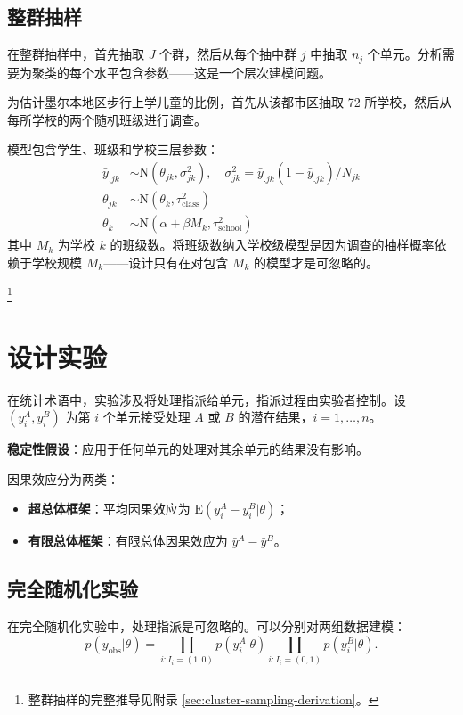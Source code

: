 \subsection{整群抽样}

在整群抽样中，首先抽取 $J$ 个群，然后从每个抽中群 $j$ 中抽取 $n_j$ 个单元。分析需要为聚类的每个水平包含参数——这是一个层次建模问题。

\begin{Example}[澳大利亚学童调查]
  为估计墨尔本地区步行上学儿童的比例，首先从该都市区抽取 72 所学校，然后从每所学校的两个随机班级进行调查。

  模型包含学生、班级和学校三层参数：
  \begin{align}
    \bar{y}_{.jk} &\sim \mathrm{N}(\theta_{jk}, \sigma_{jk}^2), \quad \sigma_{jk}^2 = \bar{y}_{.jk}(1-\bar{y}_{.jk})/N_{jk} \\
    \theta_{jk} &\sim \mathrm{N}(\theta_k, \tau_{\mathrm{class}}^2) \\
    \theta_k &\sim \mathrm{N}(\alpha + \beta M_k, \tau_{\mathrm{school}}^2)
  \end{align}
  其中 $M_k$ 为学校 $k$ 的班级数。将班级数纳入学校级模型是因为调查的抽样概率依赖于学校规模 $M_k$——设计只有在对包含 $M_k$ 的模型才是可忽略的。
\end{Example}\footnote{整群抽样的完整推导见附录 \cref{sec:cluster-sampling-derivation}。}

\section{设计实验}

在统计术语中，实验涉及将处理指派给单元，指派过程由实验者控制。设 $(y_i^A, y_i^B)$ 为第 $i$ 个单元接受处理 $A$ 或 $B$ 的潜在结果，$i=1,\ldots,n$。

\textbf{稳定性假设}：应用于任何单元的处理对其余单元的结果没有影响。

因果效应分为两类：
\begin{itemize}
  \item \textbf{超总体框架}：平均因果效应为 $\mathrm{E}(y_i^A - y_i^B|\theta)$；
  \item \textbf{有限总体框架}：有限总体因果效应为 $\bar{y}^A - \bar{y}^B$。
\end{itemize}

\subsection{完全随机化实验}

在完全随机化实验中，处理指派是可忽略的。可以分别对两组数据建模：
\begin{equation}
p(y_{\mathrm{obs}}|\theta) = \prod_{i:I_i=(1,0)} p(y_i^A|\theta) \prod_{i:I_i=(0,1)} p(y_i^B|\theta).
\end{equation}

